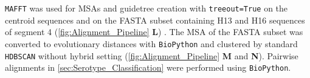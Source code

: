 \vspace{1em}

\texttt{MAFFT} was used for \glspl{MSA} and guidetree creation with \texttt{treeout=True} on the centroid sequences and on the FASTA subset containing H13 and H16 sequences of segment 4 (\autoref{fig:Alignment_Pipeline} \textsf{\textbf{L}}) \autocite{katoh_mafft_2013}. The \gls{MSA} of the FASTA subset was converted to evolutionary distances with \texttt{BioPython} and clustered by standard \texttt{HDBSCAN} without hybrid setting (\autoref{fig:Alignment_Pipeline} \textsf{\textbf{M}} and \textsf{\textbf{N}}). Pairwise alignments in \autoref{sec:Serotype_Classification} were performed using \texttt{BioPython}.